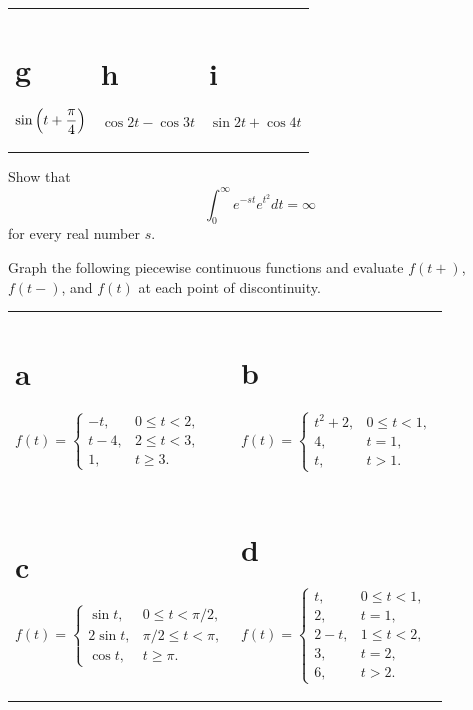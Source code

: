 \begin{exerciselist}
\begin{tabular}[t]{@{}p{112pt}@{}p{112pt}@{}p{112pt}}
    \part{g} $\displaystyle{\sin\left(t+\frac{\pi}{4}\right)}$ & \part{h} $\cos2t-\cos3t$ & \part{i} $\sin2t+\cos 4t$
  \end{tabular}

  \item\label{exer:8.1.3} Show that
  \[
    \int_{0}^{\infty}e^{-st}e^{t^{2}}dt=\infty
  \]
  for every real number $s$.

  \item\label{exer:8.1.4} Graph the following piecewise continuous functions and evaluate $f(t+)$,
        $f(t-)$, and $f(t)$ at each point of discontinuity.

  \begin{tabular}[t]{@{}p{168pt}@{}p{168pt}}
    \part{a} $f(t)=\left\{\begin{array}{cl}-t, &0\le t<2,\\t-4,&2\le t<3,\\1,&t\ge 3.\end{array}\right.$                         & \part{b} $f(t)=\left\{\begin{array}{cl}t^{2}+2,&0 \le t<1,\\4,&t=1,\\t,&t> 1.\end{array}\right.$                     \\[15pt]
    \part{c} $f(t)=\left\{\begin{array}{rl}\sin t,&0\le t<\pi/2,\\2\sin t,&\pi/2 \le t<\pi,\\\cos t,&t\ge\pi.\end{array}\right.$ & \part{d} $f(t)=\left\{\begin{array}{cl}t, &0\le t<1,\\2,&t=1,\\2-t,&1 \le t<2,\\3,&t=2,\\6,&t> 2.\end{array}\right.$
  \end{tabular}


\end{exerciselist}
